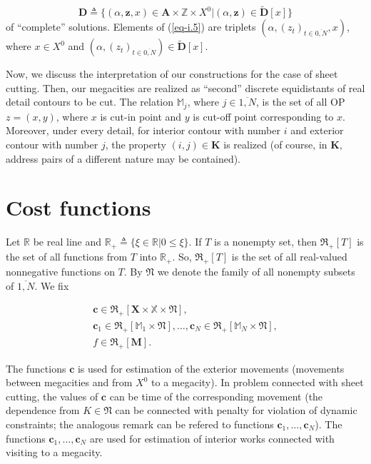 \documentclass{article}
\begin{document}
\begin{equation}
  \label{eq-i.5}
  \mathbf D \triangleq
  \big\{
    (\alpha,\mathbf z, x) \in \mathbf A \times \mathbb Z \times X^0
  \big|
    (\alpha,\mathbf z) \in \tilde {\mathbf D}[x]
  \big\}
\end{equation}
of ``complete'' solutions.
Elements of (\ref{eq-i.5})
are triplets
$(\alpha,(z_t)_{t \in \overline{0,N}}, x)$,
where
$x \in X^0$
and
$(\alpha,(z_t)_{t \in \overline{0,N}}) \in \tilde {\mathbf D}[x]$.

Now, we discuss the interpretation of our constructions
for the case of sheet cutting.
Then, our megacities are realized as ``second''
discrete equidistants of real detail contours to be cut.
The relation
$\mathbb M_j$,
where
$j \in \overline{1,N}$,
is the set of all OP
$z=(x,y)$,
where
$x$ is cut-in point and
$y$ is cut-off point corresponding to $x$.
Moreover,
under every detail,
for interior contour with number $i$
and exterior contour with number $j$,
the property
$(i,j) \in \mathbf K$
is realized
(of course, in $\mathbf K$,
address pairs of a different nature
may be contained).

\section*{Cost functions}

Let
$\mathbb R$
be real line and
$\mathbb R_+ \triangleq \{ \xi \in \mathbb R | 0 \leqslant \xi\}$.
If $T$ is a nonempty set,
then
$\mathfrak R_+[T]$
is the set of all functions from $T$
into $\mathbb R_+$.
So,
$\mathfrak R_+[T]$
is the set of all real-valued nonnegative functions on $T$.
By
$\mathfrak N$
we denote the family of all nonempty subsets of
$\overline{1,N}$.
We fix

\begin{multline}
  \label{eq-i.6}
\mathbf c \in \mathfrak R_+[\mathbf X \times \mathbb X \times \mathfrak N], \\
\mathbf c_1 \in \mathfrak R_+[\mathbb M_1 \times \mathfrak N],
\dots ,
\mathbf c_N \in \mathfrak R_+[\mathbb M_N \times \mathfrak N], \\
f \in \mathfrak R_+[\mathbf M].
\end{multline}

The functions
$\mathbf c$
is used for estimation of the exterior movements
(movements between megacities and from $X^0$ to a megacity).
In problem connected with sheet cutting,
the values of
$\mathbf c$
can be time of the corresponding movement
(the dependence from
$K \in \mathfrak N$
can be connected with penalty for violation of dynamic constraints;
the analogous remark can be refered to functions
$\mathbf c_1, \dots, \mathbf c_N$).
The functions
$\mathbf c_1, \dots, \mathbf c_N$
are used for estimation of interior works
connected with visiting to a megacity.
\end{document}
